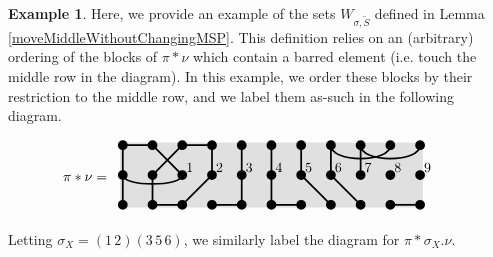 \documentclass[10pt]{amsart}
\theoremstyle{definition}
\theoremstyle{definition}
\newtheorem{exam}[exam]{Example}
\theoremstyle{plain}
\theoremstyle{remark}
\theoremstyle{plain}
\theoremstyle{plain}
\newcommand{\tS}{{\tilde{S}}}
\newcommand{\colortop}[2]{\foreach \i in {#1}  {\filldraw[fill=#2,draw=#2,line width = 1pt] (T\i) circle (4pt);}}
\newcommand{\colormid}[2]{\foreach \i in {#1}  {\filldraw[fill=#2,draw=#2,line width = 1pt] (M\i) circle (4pt);}}
\newcommand{\colorbot}[2]{\foreach \i in {#1}  {\filldraw[fill=#2,draw=#2,line width = 1pt] (B\i) circle (4pt);}}
\begin{document}
\begin{exam}\label{ex:final_lemmas} Here, we provide an example of the sets $W_{\sigma,\tS}$ defined in Lemma \ref{moveMiddleWithoutChangingMSP}. This definition relies on an (arbitrary) ordering of the blocks of $\pi\ast\nu$ which contain a barred element (i.e. touch the middle row in the diagram). In this example, we order these blocks by their restriction to the middle row, and we label them as-such in the following diagram.

\begin{align*}
    \pi\ast\nu&=\begin{array}{c}
            \begin{tikzpicture}[xscale=.75,yscale=.75,line width=1.25pt] 
                \foreach \i in {1,2,3,4,5,6,7,8,9,10,11}  { \path (\i,1.25) coordinate (T\i); \path (\i,.25) coordinate (M\i); \path (\i,-.75) coordinate (B\i); } 
                \filldraw[fill= black!12,draw=black!12,line width=4pt]  (T1) -- (T11) -- (B11) -- (B1) -- (T1);
                \draw[black] (M1)--(T1)--(T2)--(M3);
                \draw[black] (M2)--(T3)--(T4)--(M4);
                \draw[black] (T5)--(M5);
                \draw[black] (T6)--(M6);
                \draw[black] (T7)--(M7);
                \draw[black] (M8)--(T8) .. controls +(0,-0.6) and +(0,-0.6) .. (T10);
                \draw[black] (M9)--(T9) .. controls +(0,-0.6) and +(0,-0.6) .. (T11);
                \draw[black] (B1)--(M1) .. controls +(0,-0.4) and +(0,-0.4) .. (M3);
                \draw[black] (M2)--(B2)--(B3)--(M4);
                \draw[black] (M5)--(B5)--(B4);
                \draw[black] (M6)--(B6)--(B7);
                \draw[black] (M7)--(B8);
                \draw[black] (M8)--(B9);
                \draw[black] (B10)--(B11);
                \colortop{1,2,3,4,5,6,7,8,9,10,11}{black}
                \colormid{1,2,3,4,5,6,7,8,9,10,11}{black}
                \colorbot{1,2,3,4,5,6,7,8,9,10,11}{black}
                \node at (3.25,.5) {1};
                \node at (4.25,.5) {2};
                \node at (5.25,.5) {3};
                \node at (6.25,.5) {4};
                \node at (7.25,.5) {5};
                \node at (8.25,.5) {6};
                \node at (9.25,.5) {7};
                \node at (10.25,.5) {8};
                \node at (11.25,.5) {9};
            \end{tikzpicture}
        \end{array}
\end{align*}

Letting $\sigma_X=(1\,2)(3\,5\,6)$, we similarly label the diagram for $\pi\ast\sigma_X.\nu$.


\end{exam}
\end{document}
